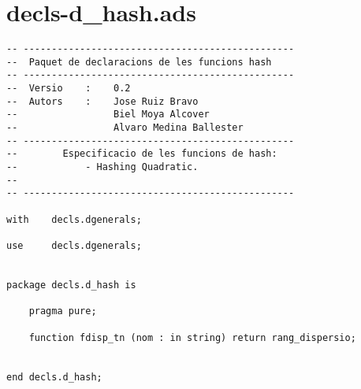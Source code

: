 \documentclass[10pt]{report}
\begin{document}
    \section{decls-d\_hash.ads}
    \begin{lstlisting}[style=Ada]
-- ------------------------------------------------
--  Paquet de declaracions de les funcions hash
-- ------------------------------------------------
--  Versio    :    0.2
--  Autors    :    Jose Ruiz Bravo
--                 Biel Moya Alcover
--                 Alvaro Medina Ballester
-- ------------------------------------------------
--        Especificacio de les funcions de hash:
--            - Hashing Quadratic.
--
-- ------------------------------------------------

with    decls.dgenerals;

use     decls.dgenerals;


package decls.d_hash is

    pragma pure;

    function fdisp_tn (nom : in string) return rang_dispersio;
    
    
end decls.d_hash;
    \end{lstlisting}
    \newpage
    
    
\end{document}
